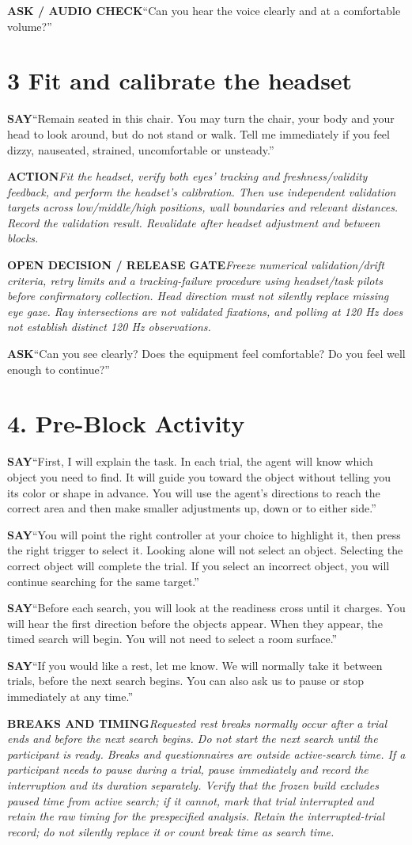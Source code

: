 \documentclass[11pt,letterpaper]{article}
\newcommand{\step}[1]{\Needspace{7\baselineskip}\section{#1}}
\newcommand{\say}[2]{\Needspace{4\baselineskip}\par\textbf{#1}\enspace #2\par}
\newcommand{\action}[2]{\Needspace{3\baselineskip}\par{\color{ActionInk}\textbf{#1}\enspace\textit{#2}}\par}
\begin{document}
\say{ASK / AUDIO CHECK}{``Can you hear the voice clearly and at a comfortable volume?''}

\step{3 Fit and calibrate the headset}
\say{SAY}{``Remain seated in this chair. You may turn the chair, your body and your head to look around, but do not stand or walk. Tell me immediately if you feel dizzy, nauseated, strained, uncomfortable or unsteady.''}
\action{ACTION}{Fit the headset, verify both eyes' tracking and freshness/validity feedback, and perform the headset's calibration. Then use independent validation targets across low/middle/high positions, wall boundaries and relevant distances. Record the validation result. Revalidate after headset adjustment and between blocks.}
\action{OPEN DECISION / RELEASE GATE}{Freeze numerical validation/drift criteria, retry limits and a tracking-failure procedure using headset/task pilots before confirmatory collection. Head direction must not silently replace missing eye gaze. Ray intersections are not validated fixations, and polling at 120 Hz does not establish distinct 120 Hz observations.}

\say{ASK}{``Can you see clearly? Does the equipment feel comfortable? Do you feel well enough to continue?''}
\clearpage
\step{4. Pre-Block Activity}
\say{SAY}{``First, I will explain the task. In each trial, the agent will know which object you need to find. It will guide you toward the object without telling you its color or shape in advance. You will use the agent's directions to reach the correct area and then make smaller adjustments up, down or to either side.''}
\say{SAY}{``You will point the right controller at your choice to highlight it, then press the right trigger to select it. Looking alone will not select an object. Selecting the correct object will complete the trial. If you select an incorrect object, you will continue searching for the same target.''}
\say{SAY}{``Before each search, you will look at the readiness cross until it charges. You will hear the first direction before the objects appear. When they appear, the timed search will begin. You will not need to select a room surface.''}
\say{SAY}{``If you would like a rest, let me know. We will normally take it between trials, before the next search begins. You can also ask us to pause or stop immediately at any time.''}
\action{BREAKS AND TIMING}{Requested rest breaks normally occur after a trial ends and before the next search begins. Do not start the next search until the participant is ready. Breaks and questionnaires are outside active-search time. If a participant needs to pause during a trial, pause immediately and record the interruption and its duration separately. Verify that the frozen build excludes paused time from active search; if it cannot, mark that trial interrupted and retain the raw timing for the prespecified analysis. Retain the interrupted-trial record; do not silently replace it or count break time as search time.}
\end{document}
